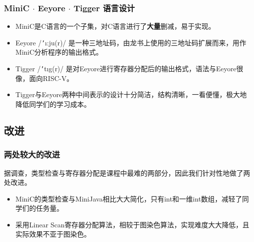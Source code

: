 \documentclass{beamer}
\begin{document}
\begin{frame}
    \frametitle{MiniC $\cdot$ Eeyore $\cdot$ Tigger 语言设计}
    \begin{itemize}
        \setlength{\itemsep}{.5cm}
        \item MiniC是C语言的一个子集，对C语言进行了\textbf{大量}删减，易于实现。

        \item Eeyore /\texttt{'}\i:ju\textschwa(r)/ 是一种三地址码，由龙书上使用的三地址码扩展而来，用作MiniC分析程序的输出格式。

        \item Tigger /\texttt{'}t\i g\textschwa(r)/ 是对Eeyore进行寄存器分配后的输出格式，语法与Eeyore很像，面向RISC-V。
    
        \item Tigger与Eeyore两种中间表示的设计十分简洁，结构清晰，一看便懂，极大地降低同学们的学习成本。
    \end{itemize}
\end{frame}


\subsection{改进}

\begin{frame}
    \frametitle{两处较大的改进}
    据调查，类型检查与寄存器分配是课程中最难的两部分，因此我们针对性地做了两处改进。
    \begin{itemize}
        \item MiniC的类型检查与MiniJava相比大大简化，只有int和一维int数组，减轻了同学们的任务量。
        \item 采用Linear Scan寄存器分配算法，相较于图染色算法，实现难度大大降低，且实际效果不亚于图染色。
    \end{itemize}
\end{frame}
\end{document}
